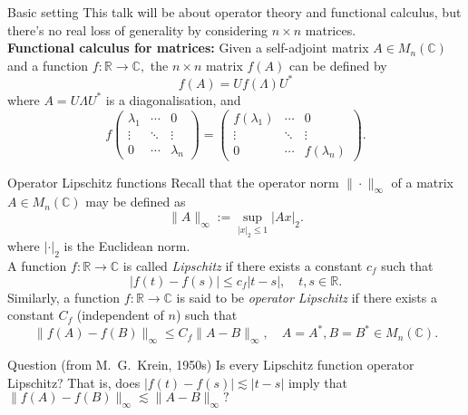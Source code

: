 \documentclass{beamer}
\numberwithin{equation}{section}
\theoremstyle{plain}
\theoremstyle{plain}
\theoremstyle{definition}
\theoremstyle{plain}
\theoremstyle{plain}
\theoremstyle{definition}
\newcommand{\Rl}{\mathbb{R}}
\newcommand{\Cplx}{\mathbb{C}}
\begin{document}
\begin{frame}{Basic setting}
    This talk will be about operator theory and functional calculus, but there's no real loss of generality by considering $n\times n$ matrices.
\pause
\\
    \textbf{Functional calculus for matrices:} Given a self-adjoint matrix $A \in M_{n}(\Cplx)$ and a function $f:\Rl\to \Cplx,$ the $n\times n$ matrix $f(A)$ can be defined by
    \[
        f(A) = Uf(\Lambda)U^*
    \]
    where $A = U\Lambda U^*$ is a diagonalisation, and
    \[
        f\begin{pmatrix} \lambda_1 & \cdots & 0 \\
                            \vdots & \ddots & \vdots \\
                             0      & \cdots & \lambda_n
         \end{pmatrix}
         =\begin{pmatrix} f(\lambda_1) & \cdots & 0 \\
                             \vdots      & \ddots & \vdots \\
                             0      & \cdots & f(\lambda_n)
         \end{pmatrix}.
    \]
\end{frame}

\begin{frame}{Operator Lipschitz functions}
    Recall that the operator norm $\|\cdot\|_{\infty}$ of a matrix $A \in M_n(\Cplx)$ may be defined as
    \[
        \|A\|_{\infty} := \sup_{|x|_2\leq 1} |Ax|_2.
    \]
    where $|\cdot|_2$ is the Euclidean norm.\\
    \pause
    A function $f:\Rl\to \Cplx$ is called \emph{Lipschitz} if there exists a constant $c_f$ such that
    \[
        |f(t)-f(s)|\leq c_f|t-s|,\quad t,s\in \Rl.
    \]\pause
    Similarly, a function $f:\Rl\to \Cplx$ is said to be \emph{operator Lipschitz} if there exists a constant $C_f$ (independent of $n$) such that
    \begin{equation*}
        \|f(A)-f(B)\|_\infty \leq C_f\|A-B\|_\infty,\quad A=A^*,B=B^* \in M_n(\Cplx).
    \end{equation*}
    \pause
    \begin{block}{Question (from M.~G.~Krein, 1950s)}
        Is every Lipschitz function operator Lipschitz?
        \pause
        That is, does $|f(t)-f(s)|\lesssim |t-s|$ imply that $\|f(A)-f(B)\|_{\infty} \lesssim \|A-B\|_{\infty}?$
    \end{block}
\end{frame}
\end{document}
